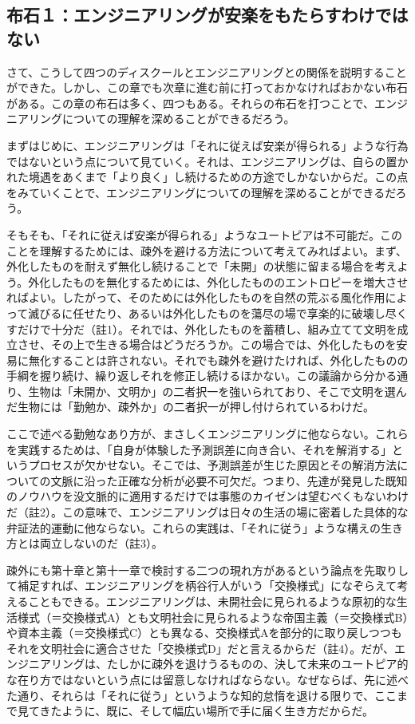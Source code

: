 \subsection{布石１：エンジニアリングが安楽をもたらすわけではない}\label{ux5e03ux77f3uxff11ux30a8ux30f3ux30b8ux30cbux30a2ux30eaux30f3ux30b0ux304cux5b89ux697dux3092ux3082ux305fux3089ux3059ux308fux3051ux3067ux306fux306aux3044}

さて、こうして四つのディスクールとエンジニアリングとの関係を説明することができた。しかし、この章でも次章に進む前に打っておかなければおかない布石がある。この章の布石は多く、四つもある。それらの布石を打つことで、エンジニアリングについての理解を深めることができるだろう。

まずはじめに、エンジニアリングは「それに従えば安楽が得られる」ような行為ではないという点について見ていく。それは、エンジニアリングは、自らの置かれた境遇をあくまで「より良く」し続けるための方途でしかないからだ。この点をみていくことで、エンジニアリングについての理解を深めることができるだろう。

そもそも、「それに従えば安楽が得られる」ようなユートピアは不可能だ。このことを理解するためには、疎外を避ける方法について考えてみればよい。まず、外化したものを耐えず無化し続けることで「未開」の状態に留まる場合を考えよう。外化したものを無化するためには、外化したもののエントロピーを増大させればよい。したがって、そのためには外化したものを自然の荒ぶる風化作用によって滅びるに任せたり、あるいは外化したものを蕩尽の場で享楽的に破壊し尽くすだけで十分だ（註1）。それでは、外化したものを蓄積し、組み立てて文明を成立させ、その上で生きる場合はどうだろうか。この場合では、外化したものを安易に無化することは許されない。それでも疎外を避けたければ、外化したものの手綱を握り続け、繰り返しそれを修正し続けるほかない。この議論から分かる通り、生物は「未開か、文明か」の二者択一を強いられており、そこで文明を選んだ生物には「勤勉か、疎外か」の二者択一が押し付けられているわけだ。

ここで述べる勤勉なあり方が、まさしくエンジニアリングに他ならない。これらを実践するためは、「自身が体験した予測誤差に向き合い、それを解消する」というプロセスが欠かせない。そこでは、予測誤差が生じた原因とその解消方法についての文脈に沿った正確な分析が必要不可欠だ。つまり、先達が発見した既知のノウハウを没文脈的に適用するだけでは事態のカイゼンは望むべくもないわけだ（註2）。この意味で、エンジニアリングは日々の生活の場に密着した具体的な弁証法的運動に他ならない。これらの実践は、「それに従う」ような構えの生き方とは両立しないのだ（註3）。

疎外にも第十章と第十一章で検討する二つの現れ方があるという論点を先取りして補足すれば、エンジニアリングを柄谷行人がいう「交換様式」になぞらえて考えることもできる。エンジニアリングは、未開社会に見られるような原初的な生活様式（＝交換様式A）とも文明社会に見られるような帝国主義（＝交換様式B）や資本主義（＝交換様式C）とも異なる、交換様式Aを部分的に取り戻しつつもそれを文明社会に適合させた「交換様式D」だと言えるからだ（註4）。だが、エンジニアリングは、たしかに疎外を退けうるものの、決して未来のユートピア的な在り方ではないという点には留意しなければならない。なぜならば、先に述べた通り、それらは「それに従う」というような知的怠惰を退ける限りで、ここまで見てきたように、既に、そして幅広い場所で手に届く生き方だからだ。


